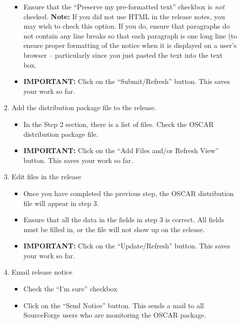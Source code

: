 \begin{enumerate}
\begin{enumerate}
\begin{itemize}
      \item Ensure that the ``Preserve my pre-formatted text''
        checkbox is {\em not} checked.  {\bf Note:} If you did not use
        HTML in the release notes, you may wish to check this option.
        If you do, ensure that paragraphs do not contain any line
        breaks so that each paragraph is one long line (to ensure
        proper formatting of the notice when it is displayed on a
        user's browser -- particularly since you just pasted the text
        into the text box.

      \item {\bf IMPORTANT:} Click on the ``Submit/Refresh'' button.
        This saves your work so far.
      \end{itemize}

  \item Add the distribution package file to the release.

    \begin{itemize}
    \item In the Step 2 section, there is a list of files.  Check the
      OSCAR distribution package file.
      
    \item {\bf IMPORTANT:} Click on the ``Add Files and/or Refresh
      View'' button.  This saves your work so far.
    \end{itemize}

  \item Edit files in the release

    \begin{itemize}
    \item Once you have completed the previous step, the OSCAR
      distribution file will appear in step 3.

    \item Ensure that all the data in the fields in step 3 is
      correct.  All fields must be filled in, or the file will not
      show up on the release.
      
    \item {\bf IMPORTANT:} Click on the ``Update/Refresh'' button.
      This saves your work so far.
    \end{itemize}

  \item Email release notice

    \begin{itemize}
    \item Check the ``I'm sure'' checkbox

    \item Click on the ``Send Notice'' button.  This sends a mail to
    all SourceForge users who are monitoring the OSCAR package.
    \end{itemize}
    
  \end{enumerate}
\end{enumerate}

